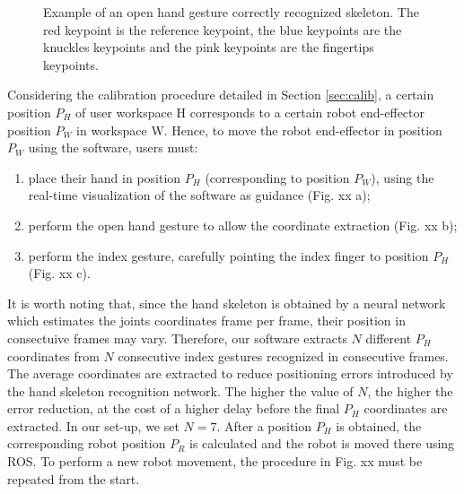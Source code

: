 \documentclass[letterpaper, 10 pt, conference]{ieeeconf}  %
\begin{document}
\begin{figure} [h!]
  \centering
  \caption{Example of an open hand gesture correctly recognized skeleton. The red keypoint is the reference keypoint, the blue keypoints are the knuckles keypoints and the pink keypoints are the fingertips keypoints.}
  \label{fig:keypoints}
\end{figure}

Considering the calibration procedure detailed in Section \ref{sec:calib}, a certain position $P_H$ of user workspace H corresponds to a certain robot end-effector position $P_W$ in workspace W. Hence, to move the robot end-effector in position $P_W$  using the software, users must: %
\begin{enumerate}
\item place their hand in position $P_H$ (corresponding to position $P_W$), using the real-time visualization of the software as guidance (Fig. xx a);
\item perform the open hand gesture to allow the coordinate extraction (Fig. xx b);
\item perform the index gesture, carefully pointing the index finger to position $P_H$ (Fig. xx c).
\end{enumerate}

It is worth noting that, since the hand skeleton is obtained by a neural network which estimates the joints coordinates frame per frame, their position in consectuive frames may vary. Therefore, our software extracts $N$ different $P_H$ coordinates from $N$ consecutive index gestures recognized in consecutive frames. The average coordinates are extracted to reduce positioning errors introduced by the hand skeleton recognition network. The higher the value of $N$, the higher the error reduction, at the cost of a higher delay before the final $P_H$ coordinates are extracted. In our set-up, we set $N = 7$.
After a position $P_H$ is obtained, the corresponding robot position $P_R$ is calculated and the robot is moved there using ROS.
To perform a new robot movement, the procedure in Fig. xx must be repeated from the start.
\end{document}
